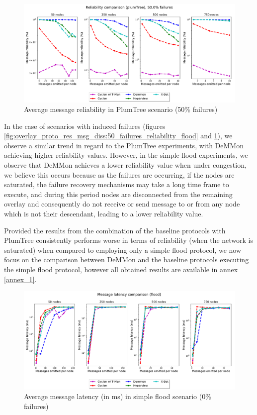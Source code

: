 \begin{figure}[htbp]
    \centering
    \includegraphics[width=\linewidth]{Chapters/evaluation/figures/flood/plumTree_50.0_failures_reliability.pdf}
    \caption{Average message reliability in PlumTree scenario (50\% failures)}
    \label{fig:overlay_proto_res_msg_diss:50_failures_reliability_plumTree}
\end{figure}

In the case of scenarios with induced failures (figures \ref{fig:overlay_proto_res_msg_diss:50_failures_reliability_flood} and \ref{fig:overlay_proto_res_msg_diss:50_failures_reliability_plumTree}), we observe a similar trend in regard to the PlumTree experiments, with DeMMon achieving higher reliability values. However, in the simple flood experiments, we observe that DeMMon achieves a lower reliability value when under congestion, we believe this occurs because as the failures are occurring, if the nodes are saturated, the failure recovery mechanisms may take a long time frame to execute, and during this period nodes are disconnected from the remaining overlay and consequently do not receive or send message to or from any node which is not their descendant, leading to a lower reliability value.

Provided the results from the combination of the baseline protocols with PlumTree consistently performs worse in terms of reliability (when the network is saturated) when compared to employing only a simple flood protocol, we now focus on the comparison between DeMMon and the baseline protocols executing the simple flood protocol, however all obtained results are available in annex \ref{annex_1}.

\begin{figure}[htbp]
    \centering
    \includegraphics[width=\linewidth]{Chapters/evaluation/figures/flood/flood_0.0_failures_msg_lat.pdf}
    \caption{Average message latency (in ms) in simple flood scenario (0\% failures)}
    \label{fig:overlay_proto_res_msg_diss:0_failures_latency_flood}
\end{figure}

